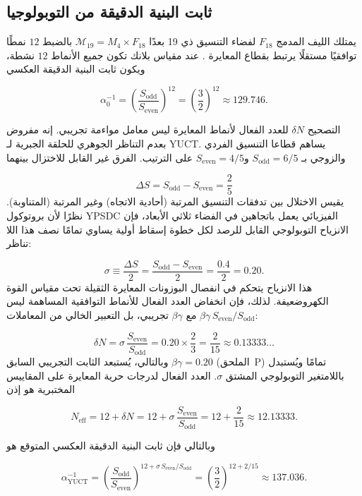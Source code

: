 \documentclass[11pt,a4paper]{article}
\begin{document}
	\subsection{ثابت البنية الدقيقة من التوبولوجيا}
	
	يمتلك الليف المدمج \(F_{18}\) لفضاء التنسيق ذي 19 بعدًا \(\mathcal{M}_{19}=M_4\times F_{18}\) بالضبط \(12\) نمطًا توافقيًا مستقلًا يرتبط بقطاع المعايرة \cite{AppendixG}. عند مقياس بلانك تكون جميع الأنماط \(12\) نشطة، ويكون ثابت البنية الدقيقة العكسي
	
	\begin{equation}
		\alpha_0^{-1} = \left(\frac{S_{\mathrm{odd}}}{S_{\mathrm{even}}}\right)^{12}
		= \left(\frac{3}{2}\right)^{12} \approx 129.746 .
	\end{equation}
	
	التصحيح \(\delta N\) للعدد الفعال لأنماط المعايرة ليس معامل مواءمة تجريبي. إنه مفروض بعدم التناظر الجوهري للحلقة الجبرية لـ YUCT. يساهم قطاعا التنسيق الفردي والزوجي بـ \(S_{\mathrm{odd}} = 6/5\) و\(S_{\mathrm{even}} = 4/5\) على الترتيب. الفرق غير القابل للاختزال بينهما
	
	\[
	\Delta S = S_{\mathrm{odd}} - S_{\mathrm{even}} = \frac{2}{5}
	\]
	يقيس الاختلال بين تدفقات التنسيق المرتبة (أحادية الاتجاه) وغير المرتبة (المتناوبة). نظرًا لأن بروتوكول YPSDC الفيزيائي يعمل باتجاهين في الفضاء ثلاثي الأبعاد، فإن الانزياح التوبولوجي القابل للرصد لكل خطوة إسقاط أولية يساوي تمامًا نصف هذا اللا تناظر:
	
	\[
	\sigma \equiv \frac{\Delta S}{2} = \frac{S_{\mathrm{odd}} - S_{\mathrm{even}}}{2}
	= \frac{0.4}{2} = 0.20.
	\]
	هذا الانزياح يتحكم في انفصال البوزونات المعايرة الثقيلة تحت مقياس القوة الكهروضعيفة. لذلك، فإن انخفاض العدد الفعال للأنماط التوافقية المساهمة ليس \(\beta\gamma\,S_{\mathrm{even}}/S_{\mathrm{odd}}\) مع \(\beta\gamma\) تجريبي، بل التعبير الخالي من المعاملات:
	
	\[
	\delta N = \sigma \, \frac{S_{\mathrm{even}}}{S_{\mathrm{odd}}}
	= 0.20 \times \frac{2}{3}
	= \frac{2}{15} \approx 0.13333\ldots
	\]
	وبالتالي، يُستبعد الثابت التجريبي السابق \(\beta\gamma = 0.20\) (الملحق~P) تمامًا ويُستبدل باللامتغير التوبولوجي المشتق \(\sigma\). العدد الفعال لدرجات حرية المعايرة على المقاييس المختبرية هو إذن
	
	\[
	N_{\mathrm{eff}} = 12 + \delta N = 12 + \sigma\,\frac{S_{\mathrm{even}}}{S_{\mathrm{odd}}}
	= 12 + \frac{2}{15} \approx 12.13333 .
	\]
	
	وبالتالي فإن ثابت البنية الدقيقة العكسي المتوقع هو
	
	\begin{equation}
		\boxed{\alpha^{-1}_{\mathrm{YUCT}} =
			\left(\frac{S_{\mathrm{odd}}}{S_{\mathrm{even}}}\right)^{12 + \sigma\,S_{\mathrm{even}}/S_{\mathrm{odd}}}
			= \left(\frac{3}{2}\right)^{12 + 2/15}
			\approx 137.036 } .
		\label{eq:alpha-yuct}
	\end{equation}
	
\end{document}
